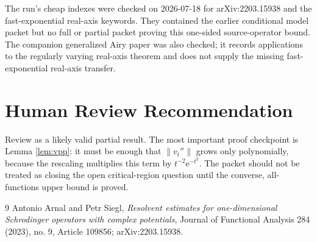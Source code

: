 \documentclass[11pt]{article}
\newcommand{\e}{\mathrm e}
\begin{document}
The run's cheap indexes were checked on 2026-07-18 for arXiv:2203.15938 and
the fast-exponential real-axis keywords.  They contained the earlier
conditional model packet but no full or partial packet proving this one-sided
source-operator bound.  The companion generalized Airy paper was also checked;
it records applications to the regularly varying real-axis theorem and does
not supply the missing fast-exponential real-axis transfer.

\section*{Human Review Recommendation}

Review as a likely valid partial result.  The most important proof checkpoint
is Lemma \ref{lem:vpp}: it must be enough that \(\|v_t''\|\) grows only
polynomially, because the rescaling multiplies this term by
\(t^{-2}\e^{-t^2}\).  The packet should not be treated as closing the open
critical-region question until the converse, all-functions upper bound is
proved.

\begin{thebibliography}{9}
Antonio Arnal and Petr Siegl,
\emph{Resolvent estimates for one-dimensional Schrodinger operators with
complex potentials},
Journal of Functional Analysis 284 (2023), no. 9, Article 109856;
arXiv:2203.15938.
\end{thebibliography}
\end{document}
